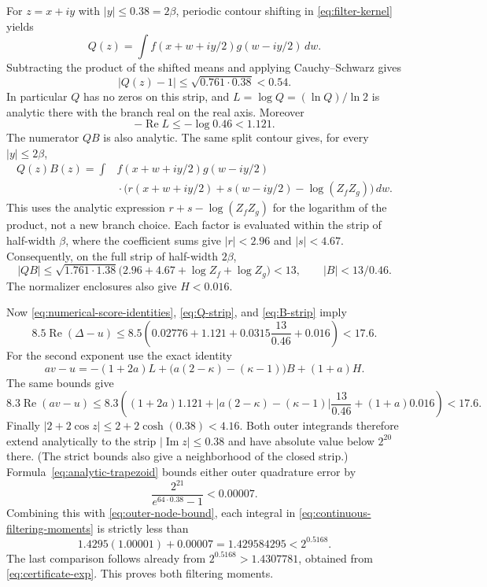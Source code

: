 For $z=x+iy$ with $|y|\le0.38=2\beta$, periodic contour shifting
in \eqref{eq:filter-kernel} yields
\[
 Q(z)=\int f(x+w+iy/2)g(w-iy/2)\,dw.
\]
Subtracting the product of the shifted means and applying
Cauchy--Schwarz gives
\begin{equation}\label{eq:Q-strip}
 |Q(z)-1|\le\sqrt{0.761\cdot0.38}<0.54.
\end{equation}
In particular $Q$ has no zeros on this strip, and
$L=\log Q=(\ln Q)/\ln2$ is analytic there with the branch real on
the real axis.  Moreover
\[
 -\operatorname{Re}L\le-\log0.46<1.121.
\]
The numerator $QB$ is also analytic.  The same split contour gives,
for every $|y|\le2\beta$,
\begin{align*}
 Q(z)B(z)
  =\int &f(x+w+iy/2)g(w-iy/2)\\
       &\mathord{}\cdot
       \bigl(r(x+w+iy/2)+s(w-iy/2)-\log(Z_fZ_g)\bigr)\,dw.
\end{align*}
This uses the analytic expression $r+s-\log(Z_fZ_g)$ for the
logarithm of the product, not a new branch choice.  Each factor is
evaluated within the strip of half-width $\beta$, where the
coefficient sums give $|r|<2.96$ and $|s|<4.67$.  Consequently, on
the full strip of half-width $2\beta$,
\begin{equation}\label{eq:B-strip}
 |Q B|\le\sqrt{1.761\cdot1.38}
       \bigl(2.96+4.67+\log Z_f+\log Z_g\bigr)<13,
 \qquad |B|<13/0.46.
\end{equation}
The normalizer enclosures also give $H<0.016$.

Now \eqref{eq:numerical-score-identities},
\eqref{eq:Q-strip}, and \eqref{eq:B-strip} imply
\[
 8.5\operatorname{Re}(\Delta-u)
 \le8.5\left(0.02776+1.121+0.0315\frac{13}{0.46}+0.016\right)
 <17.6.
\]
For the second exponent use the exact identity
\[
 av-u=-(1+2a)L+
       \bigl(a(2-\kappa)-(\kappa-1)\bigr)B+(1+a)H.
\]
The same bounds give
\[
 8.3\operatorname{Re}(av-u)
 \le8.3\left((1+2a)1.121+
       |a(2-\kappa)-(\kappa-1)|\frac{13}{0.46}
       +(1+a)0.016\right)<17.6.
\]
Finally $|2+2\cos z|\le2+2\cosh(0.38)<4.16$.
Both outer integrands therefore extend analytically to the strip
$|\operatorname{Im}z|\le0.38$ and have absolute value below $2^{20}$
there.  (The strict bounds also give a neighborhood of the closed
strip.)  Formula~\eqref{eq:analytic-trapezoid} bounds either outer
quadrature error by
\[
 \frac{2^{21}}{e^{64\cdot0.38}-1}<0.00007.
\]
Combining this with \eqref{eq:outer-node-bound}, each integral in
\eqref{eq:continuous-filtering-moments} is strictly less than
\[
 1.4295(1.00001)+0.00007
   =1.429584295<2^{0.5168}.
\]
The last comparison follows already from
$2^{0.5168}>1.4307781$, obtained from
\eqref{eq:certificate-exp}.  This proves both filtering moments.
